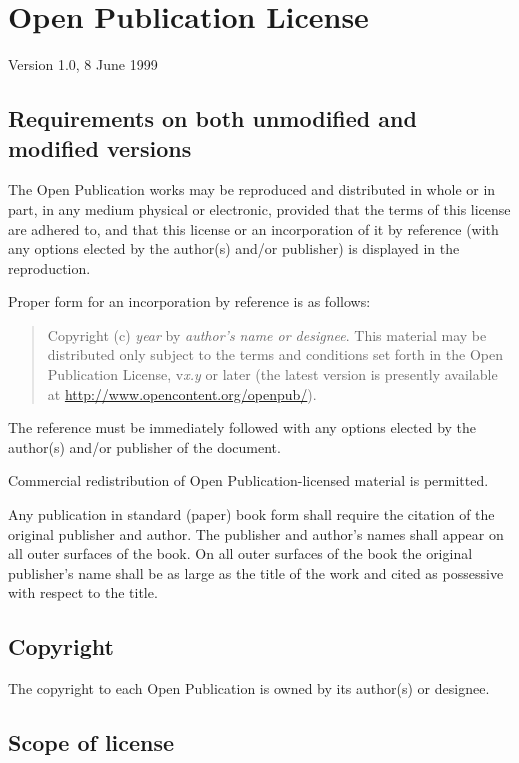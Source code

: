 \chapter{Open Publication License}
\label{cha:opl}

Version 1.0, 8 June 1999

\section{Requirements on both unmodified and modified versions}

The Open Publication works may be reproduced and distributed in whole
or in part, in any medium physical or electronic, provided that the
terms of this license are adhered to, and that this license or an
incorporation of it by reference (with any options elected by the
author(s) and/or publisher) is displayed in the reproduction.

Proper form for an incorporation by reference is as follows:

\begin{quote}
  Copyright (c) \emph{year} by \emph{author's name or designee}. This
  material may be distributed only subject to the terms and conditions
  set forth in the Open Publication License, v\emph{x.y} or later (the
  latest version is presently available at
  \url{http://www.opencontent.org/openpub/}).
\end{quote}

The reference must be immediately followed with any options elected by
the author(s) and/or publisher of the document.

Commercial redistribution of Open Publication-licensed material is
permitted.

Any publication in standard (paper) book form shall require the
citation of the original publisher and author. The publisher and
author's names shall appear on all outer surfaces of the book. On all
outer surfaces of the book the original publisher's name shall be as
large as the title of the work and cited as possessive with respect to
the title.

\section{Copyright}

The copyright to each Open Publication is owned by its author(s) or
designee.

\section{Scope of license}

